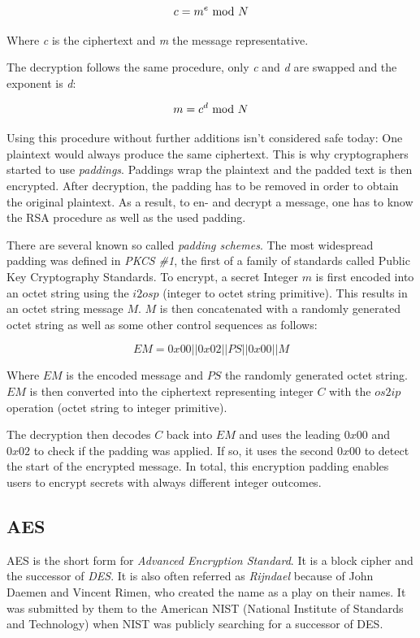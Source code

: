 $$c = m^e \ \text{mod}\ N$$

Where \textit{c} is the ciphertext and \textit{m} the message representative.

The decryption follows the same procedure, only \textit{c} and \textit{d} are
swapped and the exponent is \textit{d}:

$$m = c^d \ \text{mod}\ N$$

Using this procedure without further additions isn't considered safe today:
One plaintext would always produce the same ciphertext. This is why cryptographers
started to use \textit{paddings}. Paddings wrap the plaintext and the padded
text is then encrypted. After decryption, the padding has to be removed in order
to obtain the original plaintext. As a result, to en- and decrypt a message, one
has to know the RSA procedure as well as the used padding.

There are several known so called \textit{padding schemes}. The most widespread
padding was defined in \textit{PKCS \#1}\cite{jonsson2003public}, the first of a family of standards
called Public Key Cryptography Standards. To encrypt, a secret Integer $m$ is 
first encoded into an octet string using the $i2osp$ (integer to octet string 
primitive). This results in an octet string message $M$. $M$ is then
concatenated with a randomly generated octet string as well as some other control
sequences as follows:

$$EM = 0x00 || 0x02 || PS || 0x00 || M$$

Where $EM$ is the encoded message and $PS$ the randomly generated octet string.
$EM$ is then converted into the ciphertext representing integer $C$ with the $os2ip$
operation (octet string to integer primitive).

The decryption then decodes $C$ back into $EM$ and 
uses the leading $0x00$ and $0x02$ to check if the padding was
applied. If so, it uses the second $0x00$ to detect the start of the encrypted
message. In total, this encryption padding enables users to encrypt secrets with
always different integer outcomes.

\cite{rivest1978method}

\subsection{AES}

AES is the short form for \textit{Advanced Encryption Standard}. It is a block cipher
and the successor of \textit{DES}. It is also often referred as \textit{Rijndael}
because of John Daemen and Vincent Rimen, who created the name as a play on their
names. It was submitted by them to the American NIST (National Institute of
Standards and Technology) when NIST was publicly searching for a successor of
DES.

